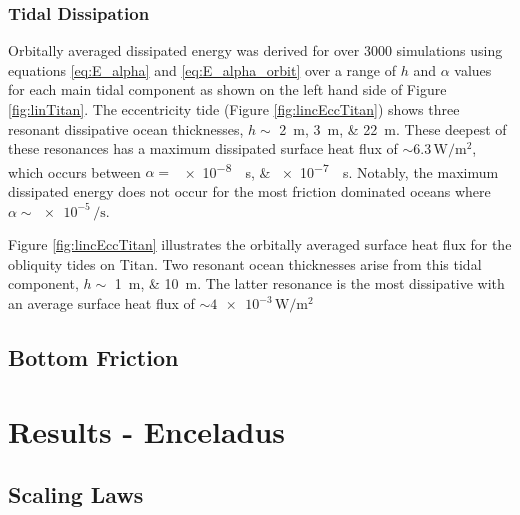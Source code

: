 \subsubsection{Tidal Dissipation \label{subsubsec:linTitan}}

Orbitally averaged dissipated energy was derived for over 3000 simulations using equations \ref{eq:E_alpha} and \ref{eq:E_alpha_orbit} over a range of $h$ and $\alpha$ values for each main tidal component as shown on the left hand side of Figure \ref{fig:linTitan}. The eccentricity tide (Figure \ref{fig:lincEccTitan}) shows three resonant dissipative ocean thicknesses, $h \sim$ \SIlist{2;3;22}{\metre}. These deepest of these resonances has a maximum dissipated surface heat flux of $\sim 6.3\, \si{\watt\per\square\metre}$, which occurs between $\alpha =$ \SIlist{e-8;e-7}{\per\second}. Notably, the maximum dissipated energy does not occur for the most friction dominated oceans where $\alpha \sim \num{e-5} \, \si{\per\second}$.

Figure \ref{fig:lincEccTitan} illustrates the orbitally averaged surface heat flux for the obliquity tides on Titan. Two resonant ocean thicknesses arise from this tidal component, $h \sim$ \SIlist{1;10}{\metre}. The latter resonance is the most dissipative with an average surface heat flux of $\sim \num{4e-3}\, \si{\watt\per\square\metre}$



\subsection{Bottom Friction \label{subsec:botTitan}}

\section{Results - Enceladus \label{sec:results_Enceladus}}

\subsection{Scaling Laws \label{subsec:scaling}}